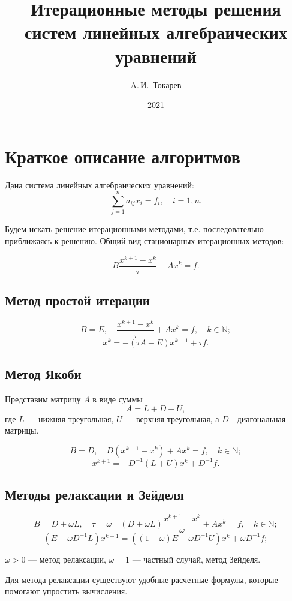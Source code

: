\documentclass[12pt, a4paper]{article}
\title{Итерационные методы решения систем линейных алгебраических уравнений}
\author{A.\,И.~Токарев}
\date{2021}
\begin{document}
\maketitle
\tableofcontents 
\newpage

\section{Краткое описание алгоритмов}
Дана система линейных алгебраических уравнений:
\begin{equation}
\sum_{j=1}^{n} a_{ij}x_i = f_i , \quad i = \overline{1,n}.
\label{Sys}
\end{equation}

Будем искать решение итерационными методами, т.е. последовательно приближаясь к решению. Общий вид стационарных итерационных методов:

\[
B\dfrac{x^{k+1}-x^k}{\tau} + Ax^k = f.
\]

\subsection{Метод простой итерации}

\[
B = E, \quad \dfrac{x^{k+1}-x^k}{\tau} + Ax^k = f, \quad k \in \mathbb{N};
\]
\[
x^k = -(\tau A - E)x^{k-1} + \tau f.
\]

\subsection{Метод Якоби}
Представим матрицу $A$ в виде суммы
\[
A = L + D + U,
\]
где $L$ --- нижняя треугольная, $U$ --- верхняя треугольная, а $D$ - диагональная матрицы.

\[
B = D, \quad D(x^{k-1}-x^k) +  Ax^k = f, \quad k \in \mathbb{N}; 
\]
\[
 x^{k+1} = -D^{-1}(L + U)x^k + D^{-1}f.
\]

\subsection{Методы релаксации и Зейделя}

\[
B = D + \omega L, \quad \tau = \omega \quad (D + \omega L)\dfrac{x^{k+1} - x^k}{\omega} + Ax^k = f, \quad k \in \mathbb{N};
\]
\[
(E + \omega D^{-1}L)x^{k+1} = ((1 - \omega)E - \omega D^{-1}U)x^k + \omega D^{-1}f;
\]

$\omega > 0$ --- метод релаксации, $\omega = 1$ --- частный случай, метод Зейделя.

Для метода релаксации существуют удобные расчетные формулы, которые помогают упростить вычисления. 
\end{document}
